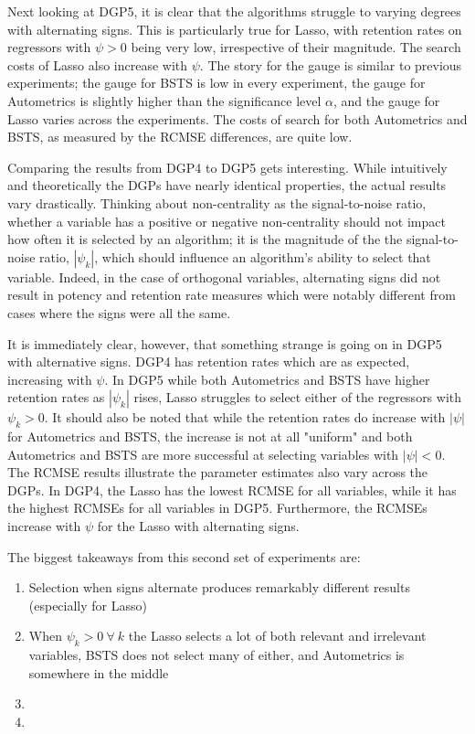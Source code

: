 \documentclass[11pt, oneside]{book}   	%
\begin{document}
Next looking at DGP5, it is clear that the algorithms struggle to varying degrees with alternating signs. This is particularly true for Lasso, with retention rates on regressors with $\psi>0$ being very low, irrespective of their magnitude. The search costs of Lasso also increase with $\psi$. The story for the gauge is similar to previous experiments; the gauge for BSTS is low in every experiment, the gauge for Autometrics is slightly higher than the significance level $\alpha$, and the gauge for Lasso varies across the experiments. The costs of search for both Autometrics and BSTS, as measured by the RCMSE differences, are quite low. 

Comparing the results from DGP4 to DGP5 gets interesting. While intuitively and theoretically the DGPs have nearly identical properties, the actual results vary drastically. Thinking about non-centrality as the signal-to-noise ratio, whether a variable has a positive or negative non-centrality should not impact how often it is selected by an algorithm; it is the magnitude of the the signal-to-noise ratio, $|\psi_{k}|$, which should influence an algorithm's ability to select that variable. Indeed, in the case of orthogonal variables, alternating signs did not result in potency and retention rate measures which were notably different from cases where the signs were all the same. 

It is immediately clear, however, that something strange is going on in DGP5 with alternative signs. DGP4 has retention rates which are as expected, increasing with $\psi$. In DGP5 while both Autometrics and BSTS have higher retention rates as $|\psi_{k}|$ rises, Lasso struggles to select either of the regressors with $\psi_{k}>0$. It should also be noted that while the retention rates do increase with $|\psi|$ for Autometrics and BSTS, the increase is not at all "uniform" and both Autometrics and BSTS are more successful at selecting variables with $|\psi|<0$. The RCMSE results illustrate the parameter estimates also vary across the DGPs. In DGP4, the Lasso has the lowest RCMSE for all variables, while it has the highest RCMSEs for all variables in DGP5. Furthermore, the RCMSEs increase with $\psi$ for the Lasso with alternating signs. 

The biggest takeaways from this second set of experiments are:

\begin{enumerate}
\item Selection when signs alternate produces remarkably different results (especially for Lasso)
\item When $\psi_{k} > 0 \ \forall \ k$ the Lasso selects a lot of both relevant and irrelevant variables, BSTS does not select many of either, and Autometrics is somewhere in the middle
\item
\item


\end{enumerate}
\end{document}
